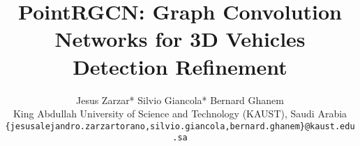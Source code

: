 \documentclass[10pt,twocolumn,letterpaper]{article}
\begin{document}
\title{PointRGCN: Graph Convolution Networks for 3D Vehicles Detection Refinement}



\author{Jesus Zarzar* Silvio Giancola* Bernard Ghanem\\
	King Abdullah University of Science and Technology (KAUST), Saudi Arabia \\
	{\tt\small \{jesusalejandro.zarzartorano,silvio.giancola,bernard.ghanem\}@kaust.edu.sa}
}

\maketitle



\newcommand{\mysection}[1]{\vspace{3pt}\noindent\textbf{#1}}
\newcommand{\TODO}[1]{\textcolor{red}{\textbf{\textit{[TODO] #1}}}}
\newcommand{\BG}[1]{\textcolor{red}{\textbf{\textit{[BG] #1}}}}
\newcommand{\JZ}[1]{\textcolor{red}{\textbf{\textit{[JZ] #1}}}}
\newcommand{\SG}[1]{\textcolor{red}{\textbf{\textit{[SG] #1}}}}
\newcommand{\sota}{state-of-the-art\xspace}
\newcommand{\Sota}{State-of-the-art\xspace}
\newcommand{\Table}[1]{Table~\ref{tab:#1}}
\newcommand{\Figure}[1]{Figure~\ref{fig:#1}}
\newcommand{\Equation}[1]{Equation~\eqref{eq:#1}}
\newcommand{\Section}[1]{Section~\ref{sec:#1}}
\newcommand{\job}[1]{\textcolor{red}{\textbf{\textit{[job-id] #1}}}}
\newcommand{\MRGCN}{MRGCN~\cite{li2019deepgcns_journal}\xspace}
\newcommand{\MR}{MRGCN~\cite{li2019deepgcns_journal}\xspace}
\newcommand{\EdgeConv}{EdgeConv~\cite{wang2019dynamic}\xspace}

\newcommand{\MVD}{MV3D~\cite{chen2017multi}\xspace}
\newcommand{\AVODFPN}{AVOD-FPN~\cite{ku2018joint}\xspace}
\newcommand{\AVOD}{AVOD~\cite{ku2018joint}\xspace}
\newcommand{\UberMMF}{UberATG-MMF~\cite{liang2019multi}\xspace}
\newcommand{\FPointNet}{F-PointNet~\cite{qi2018frustum}\xspace}
\newcommand{\VoxelNet}{VoxelNet~\cite{zhou2018voxelnet}\xspace}
\newcommand{\PIXOR}{PIXOR~\cite{yang2018pixor}\xspace}
\newcommand{\SECOND}{SECOND~\cite{yan2018second}\xspace}
\newcommand{\PointPillars}{PointPillars~\cite{lang2019pointpillars}\xspace}
\newcommand{\PointRCNN}{PointRCNN~\cite{shi2019pointrcnn}\xspace}
\newcommand{\FastPointRCNN}{Fast Point R-CNN~\cite{Chen2019FastPointRCNN}\xspace}
\newcommand{\STD}{STD~\cite{Yang2019std}\xspace}
\newcommand{\VoxelFPN}{Voxel-FPN~\cite{wang2019voxel}\xspace}
\newcommand{\PartA}{Part-~\cite{shi2019part}\xspace}
\newcommand{\Patch}{Patch~\cite{lehner2019patch}\xspace}
\end{document}
